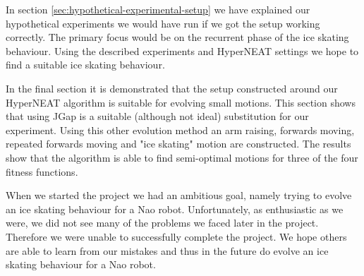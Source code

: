 \documentclass[a4paper,10pt]{article}
\begin{document}
In section \ref{sec:hypothetical-experimental-setup} we have explained our hypothetical experiments we would have run if we got the setup working correctly. The primary focus would be on the recurrent phase of the ice skating behaviour. Using the described experiments and HyperNEAT settings we hope to find a suitable ice skating behaviour.

In the final section it is demonstrated that the setup constructed around our HyperNEAT algorithm is suitable for evolving small motions. This section shows that using JGap is a suitable (although not ideal) substitution for our experiment. Using this other evolution method an arm raising, forwards moving, repeated forwards moving and "ice skating" motion are constructed. The results show that the algorithm is able to find semi-optimal motions for three of the four fitness functions.

When we started the project we had an ambitious goal, namely trying to evolve an ice skating behaviour for a Nao robot. Unfortunately, as enthusiastic as we were, we did not see many of the problems we faced later in the project. Therefore we were unable to successfully complete the project. We hope others are able to learn from our mistakes and thus in the future do evolve an ice skating behaviour for a Nao robot.



\end{document}
